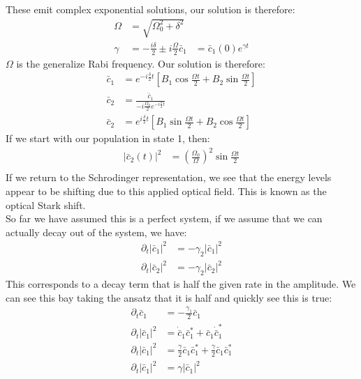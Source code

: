 These emit complex exponential solutions, our solution is therefore:
\begin{align*}
	\Omega &= \sqrt{\Omega_0^2 + \delta^2} \\
	\gamma &= -\frac{i\delta}{2} \pm i\frac{\Omega}{2}
	\bar{c}_1 &= \bar{c}_1(0) e^{\gamma t}
\end{align*}
$\Omega$ is the generalize Rabi frequency. Our solution is therefore:
\begin{align*}
	\bar{c}_1 &= e^{-i\frac{\delta}{2} t} \left[ B_1 \cos \frac{\Omega t}{2} + B_2 \sin \frac{\Omega t}{2}\right] \\
	\bar{c}_2 &= \frac{\dot{\bar{c}}_1}{-i\frac{\Omega_0}{2} e^{-i\frac{\delta}{2} t}} \\
	\bar{c}_2 &= e^{i\frac{\delta}{2} t} \left[ B_1 \sin \frac{\Omega t}{2} + B_2 \cos \frac{\Omega t}{2}\right]
\end{align*}
If we start with our population in state 1, then:
\begin{align*}
	|\bar{c}_2(t)|^2 &= \left(\frac{\Omega_0}{\Omega}\right)^2 \sin \frac{\Omega t}{2} \\
\end{align*}
If we return to the Schrodinger representation, we see that the energy levels appear to be shifting due to this applied optical field. This is known as the optical Stark shift.\\
So far we have assumed this is a perfect system, if we assume that we can actually decay out of the system, we have:
\begin{align*}
	\partial_t |\bar{c}_1|^2 &= -\gamma_2|\bar{c}_1|^2 \\
	\partial_t |\bar{c}_2|^2 &= -\gamma_2|\bar{c}_2|^2
\end{align*}
This corresponds to a decay term that is half the given rate in the amplitude. We can see this bay taking the ansatz that it is half and quickly see this is true:
\begin{align*}
	\partial_t \bar{c}_1 &= -\frac{\gamma_1}{2} \bar{c}_1 \\
	\partial_t |\bar{c}_1|^2 &= \dot{\bar{c}}_1\bar{c}_1^* + \bar{c}_1 \dot{\bar{c}}_1^* \\
	\partial_t |\bar{c}_1|^2 &= \frac{\gamma}{2}\bar{c}_1\bar{c}_1^* + \frac{\gamma}{2}\bar{c}_1 \bar{c}_1^* \\
	\partial_t |\bar{c}_1|^2 &= \gamma |\bar{c}_1|^2
\end{align*}
